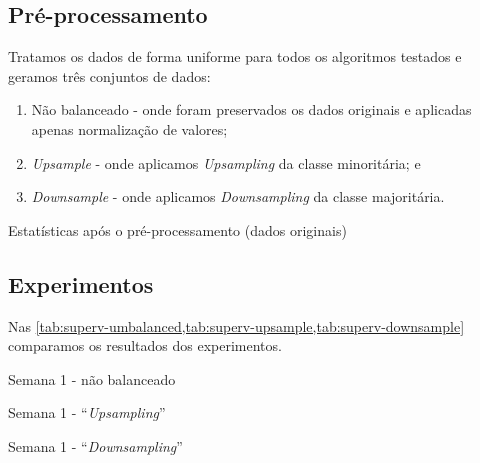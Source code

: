 \documentclass[twoside]{article}
\begin{document}
\subsection{Pré-processamento}

Tratamos os dados de forma uniforme para todos os algoritmos testados e geramos três conjuntos de dados:

\begin{enumerate}
    \item Não balanceado - onde foram preservados os dados originais e aplicadas apenas normalização de valores;
    \item \textit{Upsample} - onde aplicamos \textit{Upsampling} da classe minoritária; e
    \item \textit{Downsample} - onde aplicamos \textit{Downsampling} da classe majoritária.
\end{enumerate}

\begin{table}\scriptsize
    \centering
    
    \caption{Estatísticas após o pré-processamento (dados originais)}
    \label{tab:umbalanced_stat_after_pre}
\normalsize\end{table}  

\subsection{Experimentos}

Nas \cref{tab:superv-umbalanced,tab:superv-upsample,tab:superv-downsample} comparamos os resultados dos experimentos.

\begin{table}\scriptsize
    \centering
    
    \caption{Semana 1 - não balanceado}
    \label{tab:superv-umbalanced}
\normalsize\end{table}  

\begin{table}\scriptsize
    \centering
    
    \caption{Semana 1 - ``\textit{Upsampling}''}
    \label{tab:superv-upsample}
\normalsize\end{table}  

\begin{table}\scriptsize
    \centering
    
    \caption{Semana 1 - ``\textit{Downsampling}''}
    \label{tab:superv-downsample}
\normalsize\end{table}
\end{document}
